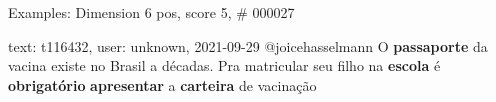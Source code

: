 \begin{frame}{Examples: Dimension 6 pos, score 5, \# 000027}
\footnotesize
\begin{exampleblock}{text: t116432, user: unknown, 2021-09-29}
@joicehasselmann O \textbf{passaporte} da vacina existe no Brasil a décadas. 
Pra matricular seu filho na \textbf{escola} é \textbf{obrigatório} 
\textbf{apresentar} a \textbf{carteira} de vacinação 
\end{exampleblock}
\end{frame}
